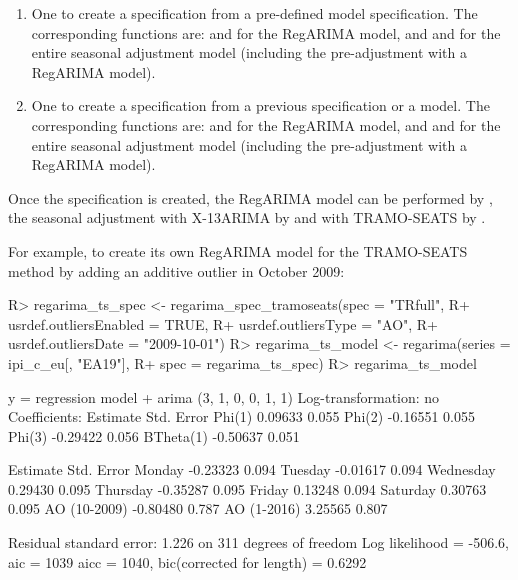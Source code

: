 \documentclass[article]{jss}
\begin{document}
\begin{enumerate}
\def\labelenumi{\arabic{enumi}.}
\item
  One to create a specification from a pre-defined 
  model specification. The corresponding functions are:
   and  for
  the RegARIMA model, and  and 
  for the entire seasonal adjustment model (including the pre-adjustment
  with a RegARIMA model).
\item
  One to create a specification from a previous specification or a
  model. The corresponding functions are:  and
   for the RegARIMA model, and
   and  for the entire seasonal
  adjustment model (including the pre-adjustment with a RegARIMA model).
\end{enumerate}

Once the specification is created, the RegARIMA model can be performed
by , the seasonal adjustment with X-13ARIMA by
 and with TRAMO-SEATS by .

For example, to create its own RegARIMA model for the TRAMO-SEATS method
by adding an additive outlier in October 2009:

\begin{CodeChunk}

\begin{CodeInput}
R> regarima_ts_spec <- regarima_spec_tramoseats(spec = "TRfull",
R+              usrdef.outliersEnabled = TRUE,
R+              usrdef.outliersType = "AO",
R+              usrdef.outliersDate = "2009-10-01")
R> regarima_ts_model <- regarima(series = ipi_c_eu[, "EA19"],
R+                               spec = regarima_ts_spec)
R> regarima_ts_model
\end{CodeInput}

\begin{CodeOutput}
y = regression model + arima (3, 1, 0, 0, 1, 1)
Log-transformation: no
Coefficients:
          Estimate Std. Error
Phi(1)     0.09633      0.055
Phi(2)    -0.16551      0.055
Phi(3)    -0.29422      0.056
BTheta(1) -0.50637      0.051

             Estimate Std. Error
Monday       -0.23323      0.094
Tuesday      -0.01617      0.094
Wednesday     0.29430      0.095
Thursday     -0.35287      0.095
Friday        0.13248      0.094
Saturday      0.30763      0.095
AO (10-2009) -0.80480      0.787
AO (1-2016)   3.25565      0.807


Residual standard error: 1.226 on 311 degrees of freedom
Log likelihood = -506.6, aic =  1039 aicc =  1040, bic(corrected for length) = 0.6292
\end{CodeOutput}
\end{CodeChunk}
\end{document}

